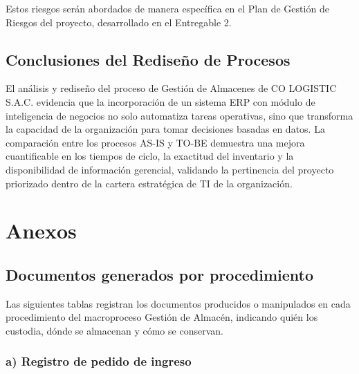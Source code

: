 \documentclass[11pt, a4paper, oneside]{report}
\begin{document}
Estos riesgos serán abordados de manera específica en el Plan de Gestión de Riesgos del proyecto, desarrollado en el Entregable 2.

\section{Conclusiones del Rediseño de Procesos}

El análisis y rediseño del proceso de Gestión de Almacenes de CO LOGISTIC S.A.C. evidencia que la incorporación de un sistema ERP con módulo de inteligencia de negocios no solo automatiza tareas operativas, sino que transforma la capacidad de la organización para tomar decisiones basadas en datos. La comparación entre los procesos AS-IS y TO-BE demuestra una mejora cuantificable en los tiempos de ciclo, la exactitud del inventario y la disponibilidad de información gerencial, validando la pertinencia del proyecto priorizado dentro de la cartera estratégica de TI de la organización.


\appendix
\chapter{Anexos}

\section{Documentos generados por procedimiento}

Las siguientes tablas registran los documentos producidos o manipulados en cada procedimiento del macroproceso Gestión de Almacén, indicando quién los custodia, dónde se almacenan y cómo se conservan.

\subsection*{a) Registro de pedido de ingreso}
\end{document}
